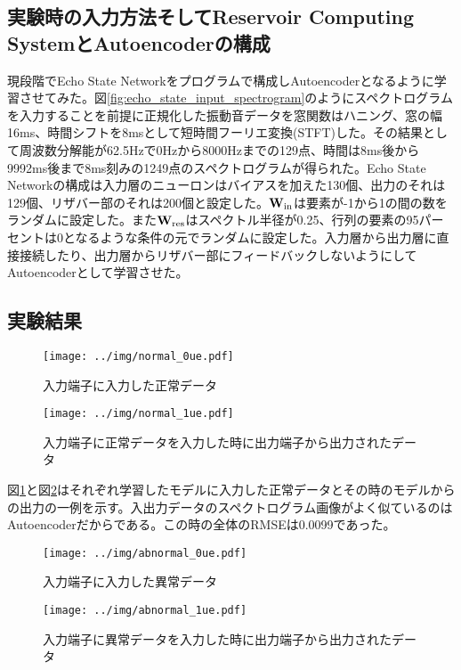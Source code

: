 \documentclass[uplatex,a4paper,10pt]{jsarticle}
\begin{document}
\subsection{実験時の入力方法そしてReservoir Computing SystemとAutoencoderの構成}
現段階でEcho State Networkをプログラムで構成しAutoencoderとなるように学習させてみた。図\ref{fig:echo_state_input_spectrogram}のようにスペクトログラムを入力することを前提に正規化した振動音データを窓関数はハニング、窓の幅16ms、時間シフトを8msとして短時間フーリエ変換(STFT)した。その結果として周波数分解能が62.5Hzで0Hzから8000Hzまでの129点、時間は8ms後から9992ms後まで8ms刻みの1249点のスペクトログラムが得られた。Echo State Networkの構成は入力層のニューロンはバイアスを加えた130個、出力のそれは129個、リザバー部のそれは200個と設定した。$\mathbf{W}_{\rm{in}}$は要素が-1から1の間の数をランダムに設定した。また$\mathbf{W}_{\rm{res}}$はスペクトル半径が0.25、行列の要素の95パーセントは0となるような条件の元でランダムに設定した。入力層から出力層に直接接続したり、出力層からリザバー部にフィードバックしないようにしてAutoencoderとして学習させた。

\subsection{実験結果}
\begin{figure}[hbtp]
	\centering
	\texttt{[image: ../img/normal\_0ue.pdf]}
	\caption{入力端子に入力した正常データ}
	\label{fig:normal_0u}
\end{figure}
\begin{figure}[hbtp]
	\centering
	\texttt{[image: ../img/normal\_1ue.pdf]}
	\caption{入力端子に正常データを入力した時に出力端子から出力されたデータ}
	\label{fig:normal_1u}
\end{figure}

図\ref{fig:normal_0u}と図\ref{fig:normal_1u}はそれぞれ学習したモデルに入力した正常データとその時のモデルからの出力の一例を示す。入出力データのスペクトログラム画像がよく似ているのはAutoencoderだからである。この時の全体のRMSEは0.0099であった。

\begin{figure}[hbtp]
	\centering
	\texttt{[image: ../img/abnormal\_0ue.pdf]}
	\caption{入力端子に入力した異常データ}
	\label{fig:abnormal_0u}
\end{figure}
\begin{figure}[hbtp]
	\centering
	\texttt{[image: ../img/abnormal\_1ue.pdf]}
	\caption{入力端子に異常データを入力した時に出力端子から出力されたデータ}
	\label{fig:abnormal_1u}
\end{figure}
\end{document}
